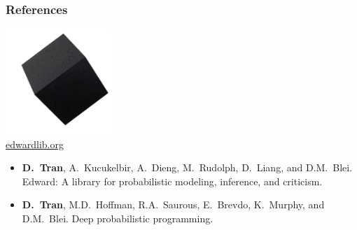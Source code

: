 \documentclass[10pt,
               xcolor={usenames,dvipsnames},
               hyperref={colorlinks,linktoc=all,citecolor=Plum,linkcolor=MidnightBlue,urlcolor=MidnightBlue},noamssymb]{beamer}
\begin{document}
\begin{frame}
\frametitle{References}
\begin{center}
\includegraphics[width=0.3\textwidth]{img/edward.png}
\\
\large \url{edwardlib.org}
\end{center}
\vspace{2ex}

\begin{itemize}
\item
\textbf{D.~Tran}, A.~Kucukelbir, A.~Dieng, M.~Rudolph, D.~Liang, and
D.M.~Blei.
Edward: A library for probabilistic modeling, inference, and criticism.
\item
\textbf{D.~Tran}, M.D.~Hoffman, R.A.~Saurous, E.~Brevdo, K.~Murphy, and
D.M.~Blei.
Deep probabilistic programming. \\
\end{itemize}
\end{frame}
\end{document}
